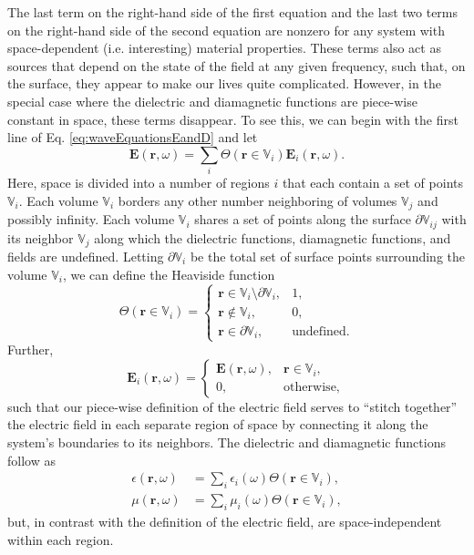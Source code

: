 The last term on the right-hand side of the first equation and the last two terms on the right-hand side of the second equation are nonzero for any system with space-dependent (i.e. interesting) material properties. These terms also act as sources that depend on the state of the field at any given frequency, such that, on the surface, they appear to make our lives quite complicated. However, in the special case where the dielectric and diamagnetic functions are piece-wise constant in space, these terms disappear. To see this, we can begin with the first line of Eq. \eqref{eq:waveEquationsEandD} and let
\begin{equation}
\mathbf{E}(\mathbf{r},\omega) = \sum_i\Theta(\mathbf{r}\in\mathbb{V}_i)\mathbf{E}_i(\mathbf{r},\omega).
\end{equation}
Here, space is divided into a number of regions $i$ that each contain a set of points $\mathbb{V}_i$. Each volume $\mathbb{V}_i$ borders any other number neighboring of volumes $\mathbb{V}_j$ and possibly infinity. Each volume $\mathbb{V}_i$ shares a set of points along the surface $\partial\mathbb{V}_{ij}$ with its neighbor $\mathbb{V}_j$ along which the dielectric functions, diamagnetic functions, and fields are undefined. Letting $\partial\mathbb{V}_i$ be the total set of surface points surrounding the volume $\mathbb{V}_i$, we can define the Heaviside function
\begin{equation}
\Theta(\mathbf{r}\in\mathbb{V}_i) = 
\begin{cases}
\mathbf{r}\in\mathbb{V}_i\setminus\partial\mathbb{V}_i, & 1,\\
\mathbf{r}\notin\mathbb{V}_i, & 0,\\
\mathbf{r}\in\partial\mathbb{V}_i, & \mathrm{undefined}.
\end{cases}
\end{equation}
Further, 
\begin{equation}
\mathbf{E}_i(\mathbf{r},\omega) = 
\begin{cases}
\mathbf{E}(\mathbf{r},\omega), & \mathbf{r}\in\mathbb{V}_i,\\
0, & \mathrm{otherwise},
\end{cases}
\end{equation}
such that our piece-wise definition of the electric field serves to ``stitch together'' the electric field in each separate region of space by connecting it along the system's boundaries to its neighbors. The dielectric and diamagnetic functions follow as
\begin{equation}
\begin{split}
\epsilon(\mathbf{r},\omega) &= \sum_i\epsilon_i(\omega)\Theta(\mathbf{r}\in\mathbb{V}_i),\\
\mu(\mathbf{r},\omega) &= \sum_i\mu_i(\omega)\Theta(\mathbf{r}\in\mathbb{V}_i),
\end{split}
\end{equation}
but, in contrast with the definition of the electric field, are space-independent within each region.

